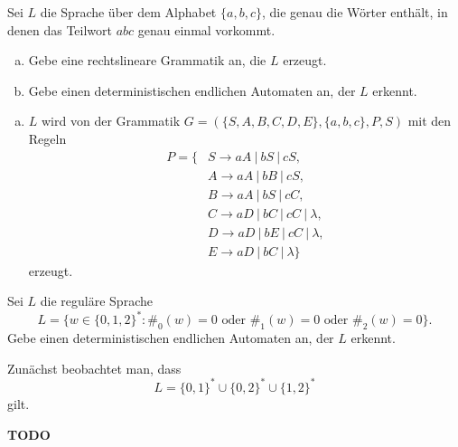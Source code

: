 \documentclass[german,headsepline]{scrartcl}
\theoremstyle{definition}
\begin{document}
	\begin{question}
		Sei $L$ die Sprache über dem Alphabet $\{a,b,c\}$, die genau die Wörter enthält,
		in denen das Teilwort $abc$ genau einmal vorkommt.
		\begin{enumerate}[(a)]
			\item Gebe eine rechtslineare Grammatik an, die $L$ erzeugt.
			\item Gebe einen deterministischen endlichen Automaten an, der $L$ erkennt.
		\end{enumerate}
	\end{question}
	\begin{solution}
		\begin{enumerate}[(a)]
			\item $L$ wird von der Grammatik $G=(\{S,A,B,C,D,E\},\{a,b,c\},P,S)$ mit den Regeln
				\begin{align*}
					P=\{&S\rightarrow aA~|~bS~|~cS, \\
					&A\rightarrow aA~|~bB~|~cS, \\
					&B\rightarrow aA~|~bS~|~cC, \\
					&C\rightarrow aD~|~bC~|~cC~|~\lambda, \\
					&D\rightarrow aD~|~bE~|~cC~|~\lambda, \\
					&E\rightarrow aD~|~bC~|~\lambda\}
				\end{align*}
				erzeugt.
		\end{enumerate}
	\end{solution}
	
	\begin{question}
		Sei $L$ die reguläre Sprache
		\[L=\{w\in\{0,1,2\}^*\colon\#_0(w)=0\text{ oder }\#_1(w)=0\text{ oder }\#_2(w)=0\}.\]
		Gebe einen deterministischen endlichen Automaten an, der $L$ erkennt.
	\end{question}
	\begin{solution}
		Zunächst beobachtet man, dass
		\[L=\{0,1\}^*\cup\{0,2\}^*\cup\{1,2\}^*\]
		gilt.
		
		\textbf{TODO}
	\end{solution}
\end{document}
